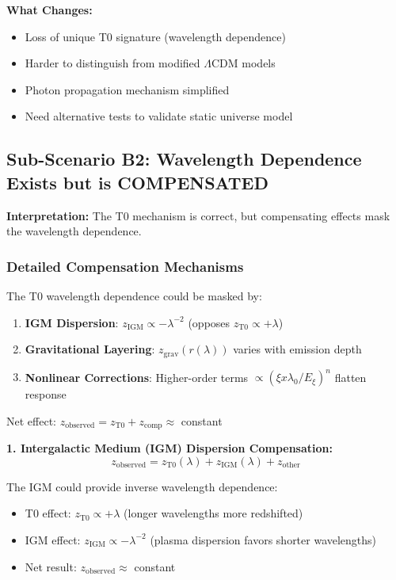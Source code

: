 \documentclass[12pt,a4paper]{article}
\theoremstyle{definition}
\begin{document}
	\textbf{What Changes:}
	\begin{itemize}
		\item Loss of unique T0 signature (wavelength dependence)
		\item Harder to distinguish from modified $\Lambda$CDM models
		\item Photon propagation mechanism simplified
		\item Need alternative tests to validate static universe model
	\end{itemize}
	
	\subsection{Sub-Scenario B2: Wavelength Dependence Exists but is COMPENSATED}
	\label{subsec:scenario_b2}
	
	\textbf{Interpretation:} The T0 mechanism is correct, but compensating effects mask the wavelength dependence.
	
	\subsubsection{Detailed Compensation Mechanisms}
	
	\begin{formula}[title=Three Compensation Mechanisms]
		The T0 wavelength dependence could be masked by:
		\begin{enumerate}
			\item \textbf{IGM Dispersion}: $z_{\text{IGM}} \propto -\lambda^{-2}$ (opposes $z_{\text{T0}} \propto +\lambda$)
			\item \textbf{Gravitational Layering}: $z_{\text{grav}}(r(\lambda))$ varies with emission depth
			\item \textbf{Nonlinear Corrections}: Higher-order terms $\propto (\xi x \lambda_0/E_\xi)^n$ flatten response
		\end{enumerate}
		Net effect: $z_{\text{observed}} = z_{\text{T0}} + z_{\text{comp}} \approx$ constant
	\end{formula}
	
	\textbf{1. Intergalactic Medium (IGM) Dispersion Compensation:}
	\begin{equation}
		z_{\text{observed}} = z_{\text{T0}}(\lambda) + z_{\text{IGM}}(\lambda) + z_{\text{other}}
	\end{equation}
	
	The IGM could provide inverse wavelength dependence:
	\begin{itemize}
		\item T0 effect: $z_{\text{T0}} \propto +\lambda$ (longer wavelengths more redshifted)
		\item IGM effect: $z_{\text{IGM}} \propto -\lambda^{-2}$ (plasma dispersion favors shorter wavelengths)
		\item Net result: $z_{\text{observed}} \approx$ constant
	\end{itemize}
	
\end{document}
